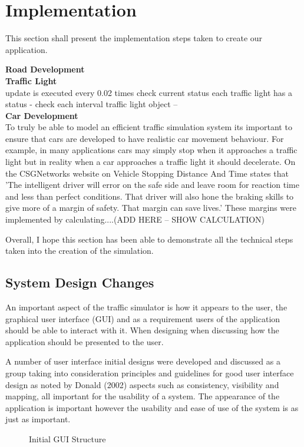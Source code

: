 \documentclass[11pt]{article}
\begin{document}
	\section{Implementation} %
	This section shall present the implementation steps taken to create our application. 
	
	\textbf{Road Development}\\
	\textbf{Traffic Light}\\
	update is executed every 0.02 times 
	check current status
	each traffic light has a status - check each interval 
	traffic light object -- \\
	\textbf{Car Development}\\
	To truly be able to model an efficient traffic simulation system its important to ensure that cars are developed to have realistic car movement behaviour. For example, in many applications cars may simply stop when it approaches a traffic light but in reality when a car approaches a traffic light it should decelerate. On the CSGNetworks website on Vehicle Stopping Distance And Time \cite{CSGNetwork} states that 'The intelligent driver will error on the safe side and leave room for reaction time and less than perfect conditions. That driver will also hone the braking skills to give more of a margin of safety. That margin can save lives.' These margins were implemented by calculating....(ADD HERE -- SHOW CALCULATION)

	Overall, I hope this section has been able to demonstrate all the technical steps taken into the creation of the simulation. 
	
	\subsection{System Design Changes}
	An important aspect of the traffic simulator is how it appears to the user, the graphical user interface (GUI) and as a requirement users of the application should be able to interact with it. When designing when discussing how the application should be presented to the user.
	
	A number of user interface initial designs were developed and discussed as a group taking into consideration principles and guidelines for good user interface design as noted by Donald \cite{Norman} (2002) aspects such as consistency, visibility and mapping, all important for the usability of a system. The appearance of the application is important however the usability and ease of use of the system is as just as important.
	\begin{figure}[h]
	\caption{Initial GUI Structure}
	\label{initialGUI}
	\end{figure}
	
\end{document}

